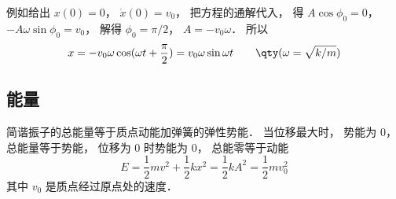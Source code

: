 例如给出 $x(0) = 0$，  $\dot x(0) = v_0$， 把方程的通解代入， 得 $A\cos \phi_0 = 0$，  $ - A\omega \sin \phi_0 = v_0$， 解得 $\phi_0 = \pi /2$，  $A =  -v_0\omega $． 所以
\begin{equation}
x =  - v_0\omega \cos (\omega t + \frac{\pi }{2}) = v_0\omega \sin \omega t \qquad \qty(\omega  = \sqrt{k/m})
\end{equation}

\subsection{能量}

简谐振子的总能量等于质点动能加弹簧的弹性势能． 当位移最大时， 势能为 0， 总能量等于势能， 位移为 0 时势能为 0， 总能零等于动能
\begin{equation}
E = \frac{1}{2} mv^2 + \frac12 k x^2 = \frac12 k A^2 = \frac12 m v_0^2
\end{equation}
其中 $v_0$ 是质点经过原点处的速度．
